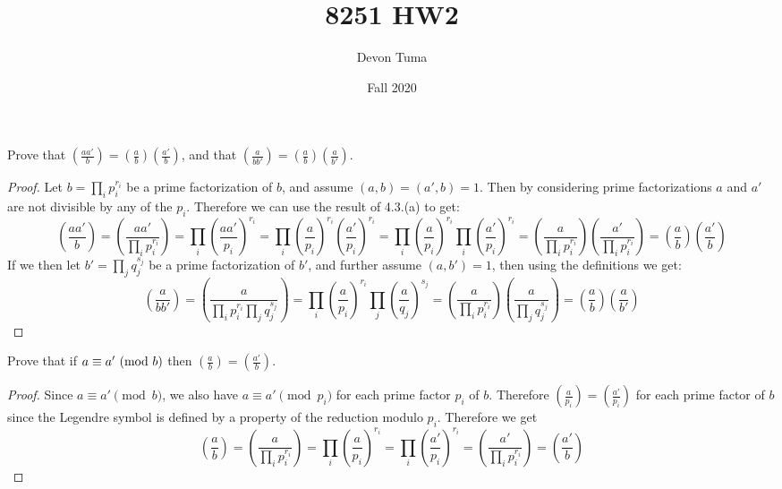\documentclass[11pt]{article}
\title{8251 HW2}
\author{Devon Tuma}
\date{Fall 2020}
\newcommand{\legendre}[2]{\genfrac{(}{)}{}{}{#1}{#2}}
\begin{document}
\maketitle


Prove that $\legendre{aa'}{b} = \legendre{a}{b}\legendre{a'}{b}$, and that $\legendre{a}{bb'} = \legendre{a}{b}\legendre{a}{b'}$.
\begin{proof}
  Let $b = \prod_i p_i^{r_i}$ be a prime factorization of $b$, and assume $(a,b) = (a',b) = 1$. Then by considering prime factorizations $a$ and $a'$ are not divisible by any of the $p_i$. Therefore we can use the result of 4.3.(a) to get:
  \begin{equation*}
    \legendre{aa'}{b} = \legendre{aa'}{\prod_i p_i^{r_i}}
    = \prod_i \legendre{aa'}{p_i}^{r_i}
    = \prod_i \legendre{a}{p_i}^{r_i} \legendre{a'}{p_i}^{r_i}
    = \prod_i \legendre{a}{p_i}^{r_i} \prod_i \legendre{a'}{p_i}^{r_i}
    = \legendre{a}{\prod_i p_i^{r_i}} \legendre{a'}{\prod_i p_i^{r_i}}
    = \legendre{a}{b} \legendre{a'}{b}
  \end{equation*}
  If we then let $b' = \prod_j q_j^{s_j}$ be a prime factorization of $b'$, and further assume $(a,b') = 1$, then using the definitions we get:
  \begin{equation*}
    \legendre{a}{bb'} = \legendre{a}{\prod_i p_i^{r_i} \prod_j q_j^{s_j}}
    = \prod_i \legendre{a}{p_i}^{r_i} \prod_j \legendre{a}{q_j}^{s_j}
    = \legendre{a}{\prod_i p_i^{r_i}} \legendre {a}{\prod_j q_j^{s_j}}
    = \legendre{a}{b} \legendre{a}{b'}
  \end{equation*}
\end{proof}

Prove that if $a \equiv a'\ (\text{mod}\ b)$ then $\legendre{a}{b} = \legendre{a'}{b}$.
\begin{proof}
  Since $a \equiv a' \pmod b$, we also have $a \equiv a' \pmod p_i$ for each prime factor $p_i$ of $b$. Therefore $\legendre{a}{p_i} = \legendre{a'}{p_i}$ for each prime factor of $b$ since the Legendre symbol is defined by a property of the reduction modulo $p_i$. Therefore we get
  \begin{equation*}
    \legendre{a}{b} = \legendre{a}{\prod_i p_i^{r_i}}
    = \prod_i \legendre{a}{p_i}^{r_i}
    = \prod_i \legendre{a'}{p_i}^{r_i}
    = \legendre{a'}{\prod_i p_i^{r_i}}
    = \legendre{a'}{b}
  \end{equation*}
\end{proof}
\end{document}
